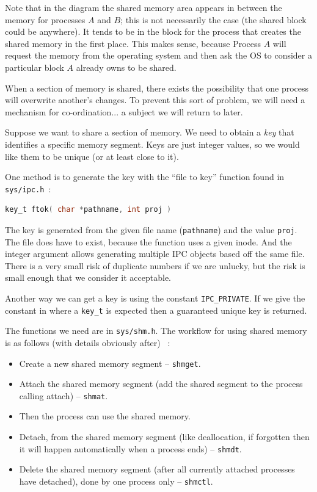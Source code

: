 Note that in the diagram the shared memory area appears in between the memory for processes $A$ and $B$; this is not necessarily the case (the shared block could be anywhere). It tends to be in the block for the process that creates the shared memory in the first place. This makes sense, because Process $A$ will request the memory from the operating system and then ask the OS to consider a particular block $A$ already owns to be shared.

When a section of memory is shared, there exists the possibility that one process will overwrite another's changes. To prevent this sort of problem, we will need a mechanism for co-ordination... a subject we will return to later.

Suppose we want to share a section of memory. We need to obtain a \textit{key} that identifies a specific memory segment. Keys are just integer values, so we would like them to be unique (or at least close to it).

One method is to generate the key with the ``file to key'' function found in \texttt{sys/ipc.h}~\cite{lpi}:
\begin{lstlisting}[language=C]
key_t ftok( char *pathname, int proj )
\end{lstlisting}

The key is generated from the given file name (\texttt{pathname}) and the value \texttt{proj}. The file does have to exist, because the function uses a given inode. And the integer argument allows generating multiple IPC objects based off the same file. There is a very small risk of duplicate numbers if we are unlucky, but the risk is small enough that we consider it acceptable.

Another way we can get a key is using the constant \texttt{IPC\_PRIVATE}. If we give the constant in where a \texttt{key\_t} is expected then a guaranteed unique key is returned.

The functions we need are in \texttt{sys/shm.h}. The workflow for using shared memory is as follows (with details obviously after) ~\cite{lpi}:
\begin{itemize}
	\item Create a new shared memory segment -- \texttt{shmget}.
	\item Attach the shared memory segment (add the shared segment to the process calling attach) -- \texttt{shmat}.
	\item Then the process can use the shared memory.
	\item Detach, from the shared memory segment (like deallocation, if forgotten then it will happen automatically when a process ends) -- \texttt{shmdt}.
	\item Delete the shared memory segment (after all currently attached processes have detached), done by one process only -- \texttt{shmctl}.
\end{itemize}

